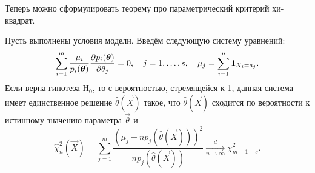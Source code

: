 Теперь можно сформулировать теорему про параметрический критерий хи-квадрат.
\begin{theorem}
	Пусть выполнены условия модели. Введём следующую систему уравнений:
	\begin{equation}
		\sum_{i = 1}^{m} \frac{\mu_{i}}{p_{i}(\bm{\theta})}\pdv{p_{i}(\bm{\theta})}{\theta_{j}} = 0, \quad j = 1, \ldots, s, \quad \mu_{j} = \sum_{i = 1}^{n} \mathbf{1}_{X_{i} = a_{j}}.
	\end{equation}
	Если верна гипотеза $\mathrm{H}_{0}$, то с вероятностью, стремящейся к 1, данная система имеет единственное решение $\hat{\theta}(\vec{X})$ такое, что $\hat{\theta}(\vec{X})$ сходится по вероятности к истинному значению параметра $\vec{\theta}$ и
	\begin{equation}
		\hat{\chi}^{2}_{n}(\vec{X}) = \sum_{j = 1}^{m} \frac{(\mu_{j} - np_{j}(\hat{\theta}(\vec{X})))^{2}}{np_{j}(\hat{\theta}(\vec{X}))} \xrightarrow[n \to \infty]{d} \chi^{2}_{m - 1 - s}.
	\end{equation}
\end{theorem}
